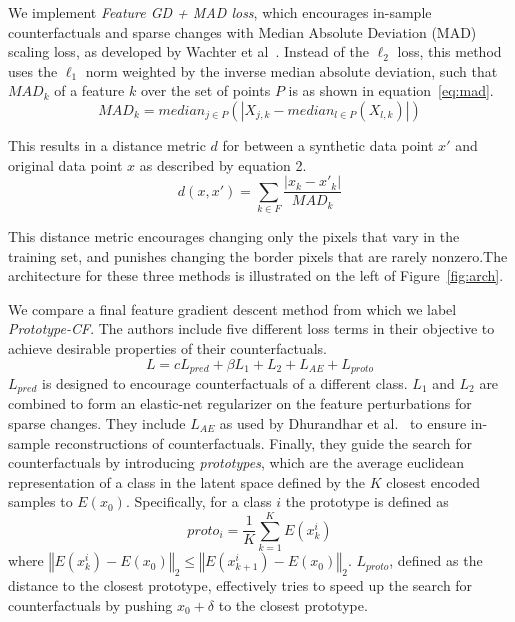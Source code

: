 \documentclass[letterpaper]{article} %
\begin{document}
We implement \textit{Feature GD + MAD loss}, which encourages in-sample counterfactuals and sparse changes with Median Absolute Deviation (MAD) scaling loss, as developed by Wachter et al~\cite{wachter2017counterfactual}. Instead of the $\ell_2$ loss, this method uses the $\ell_1$ norm weighted by the inverse median absolute deviation, such that $MAD_k$ of a feature $k$ over the set of points $P$ is as shown in equation~\ref{eq:mad}.
\begin{equation}
    {MAD}_k = median_{j\in{P}}(|X_{j,k} - median_{l\in{P}}(X_{l,k})|)
    \label{eq:mad}
\end{equation}

This results in a distance metric $d$ for between a synthetic data point $x'$ and original data point $x$ as described by equation 2.
\begin{equation}
    d(x, x') = \sum_{k\in{F}}\frac{|x_k-x'_k|}{MAD_k}
\end{equation}

This distance metric encourages changing only the pixels that vary in the training set, and punishes changing the border pixels that are rarely nonzero.The architecture for these three methods is illustrated on the left of Figure~\ref{fig:arch}.

We compare a final feature gradient descent method from \cite{looveren2019interpretable} which we label \textit{Prototype-CF}. The authors include five different loss terms in their objective to achieve desirable properties of their counterfactuals. $$ L = cL_{pred} + \beta L_1 + L_2 + L_{AE} + L_{proto}$$ $L_{pred}$ is designed to encourage counterfactuals of a different class. $L_1$ and $L_2$ are combined to form an elastic-net regularizer on the feature perturbations for sparse changes. They include $L_{AE}$ as used by Dhurandhar et al.~\cite{dhurandhar2018tip} to ensure in-sample reconstructions of counterfactuals. Finally, they guide the search for counterfactuals by introducing \textit{prototypes}, which are the average euclidean representation of a class in the latent space defined by the $K$ closest encoded samples to $E(x_0)$. Specifically, for a class $i$ the prototype is defined as $$proto_i = \frac{1}{K}\sum_{k=1}^K E(x_k^i)$$ where $\left\Vert E(x_k^i) - E(x_0)\right\Vert_2 \leq \left\Vert E(x_{k+1}^i) - E(x_0)\right\Vert_2$. $L_{proto}$, defined as the distance to the closest prototype, effectively tries to speed up the search for counterfactuals by pushing $x_0 +\delta$ to the closest prototype. 

\end{document}
